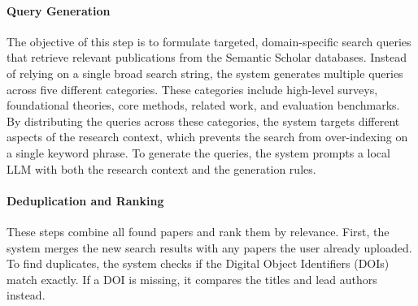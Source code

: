 \paragraph{Query Generation}
The objective of this step is to formulate targeted, domain-specific search queries that retrieve relevant publications from the Semantic Scholar databases.
Instead of relying on a single broad search string, the system generates multiple queries across five different categories.
These categories include high-level surveys, foundational theories, core methods, related work, and evaluation benchmarks.
By distributing the queries across these categories, the system targets different aspects of the research context, which prevents the search from over-indexing on a single keyword phrase.
To generate the queries, the system prompts a local LLM with both the research context and the generation rules.

\paragraph{Deduplication and Ranking}
These steps combine all found papers and rank them by relevance.
First, the system merges the new search results with any papers the user already uploaded.
To find duplicates, the system checks if the Digital Object Identifiers (DOIs) match exactly.
If a DOI is missing, it compares the titles and lead authors instead.

